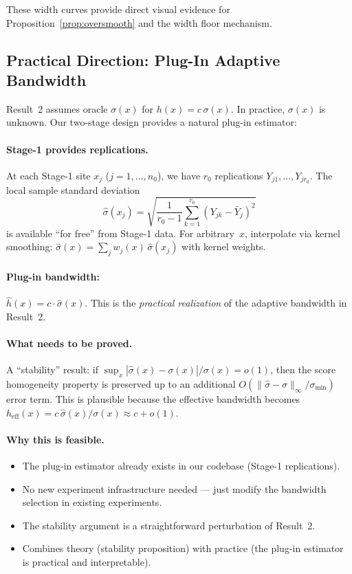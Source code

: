 \documentclass[11pt]{article}
\begin{document}
These width curves provide direct visual evidence for
Proposition~\ref{prop:oversmooth} and the width floor mechanism.

\subsection{Practical Direction: Plug-In Adaptive Bandwidth}
\label{sec:plugin-h}

Result~2 assumes oracle $\sigma(x)$ for $h(x) = c\,\sigma(x)$. In
practice, $\sigma(x)$ is unknown. Our two-stage design provides a
natural plug-in estimator:

\paragraph{Stage-1 provides replications.}
At each Stage-1 site $x_j$ ($j = 1, \ldots, n_0$), we have $r_0$
replications $Y_{j1}, \ldots, Y_{jr_0}$. The local sample standard
deviation
\[
  \hat\sigma(x_j) = \sqrt{\frac{1}{r_0 - 1}
  \sum_{k=1}^{r_0} (Y_{jk} - \bar Y_j)^2}
\]
is available ``for free'' from Stage-1 data. For arbitrary~$x$,
interpolate via kernel smoothing:
$\hat\sigma(x) = \sum_j w_j(x)\,\hat\sigma(x_j)$ with kernel weights.

\paragraph{Plug-in bandwidth:}
$\hat h(x) = c \cdot \hat\sigma(x)$. This is the \emph{practical
realization} of the adaptive bandwidth in Result~2.

\paragraph{What needs to be proved.}
A ``stability'' result: if
$\sup_x |\hat\sigma(x) - \sigma(x)| / \sigma(x) = o(1)$, then the
score homogeneity property is preserved up to an additional
$O(\|\hat\sigma - \sigma\|_\infty / \sigma_{\min})$ error term. This is
plausible because the effective bandwidth becomes
$h_{\mathrm{eff}}(x) = c\,\hat\sigma(x) / \sigma(x) \approx c + o(1)$.

\paragraph{Why this is feasible.}
\begin{itemize}
  \item The plug-in estimator already exists in our codebase (Stage-1
    replications).
  \item No new experiment infrastructure needed --- just modify the
    bandwidth selection in existing experiments.
  \item The stability argument is a straightforward perturbation of
    Result~2.
  \item Combines theory (stability proposition) with practice (the
    plug-in estimator is practical and interpretable).
\end{itemize}
\end{document}
